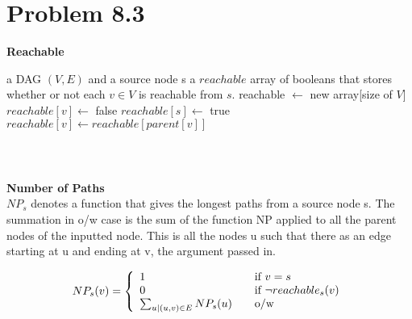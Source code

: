 \documentclass[12pt,letterpaper]{article}
\newcommand\hwnum{8}                  %
\newenvironment{answer}[1]{
  \section*{Problem \hwnum.#1}
}{\newpage}
\begin{document}
\newcommand{\tabb}[1]{\hspace{.2\textwidth}\rlap{#1}}

\begin{answer}{3}

\textbf{Reachable} \\

\begin{algorithmic}
\tt{

	\Require a DAG $(V, E)$ and a source node s
	\Ensure a $reachable$ array of booleans that stores whether or not each $v \in V$ is reachable from $s$.
	\State reachable $\leftarrow$ new array[size of $V$]
	\For{v $\in$ $[V^*(0), V(s))$}
		\State $reachable[v] \leftarrow$ false
    \EndFor
    \State $reachable[s] \leftarrow$ true
			\State $reachable[v] \leftarrow reachable[parent[v]]$
        \EndFor
    \EndFor
\EndFunction
}
\end{algorithmic}

\begin{verbatim}



\end{verbatim}










\textbf{Number of Paths} \\

$NP_s$ denotes a function that gives the longest paths from a source node s. The summation in o/w case is the sum of the function NP applied to all the parent nodes of the inputted node. This is all the nodes u such that there as an edge starting at u and ending at v, the argument passed in. 



\[ NP_s(v) = \left\{ 
  \begin{array}{l l}
    1 & \quad \text{if $v = s$}\\
    0 & \quad \text{if $\neg reachable_s(v)$}\\
    \sum_{u|(u,v)\in E} NP_s(u)& \quad \text{o/w}
  \end{array} \right.\]\\























\end{answer}
\end{document}
